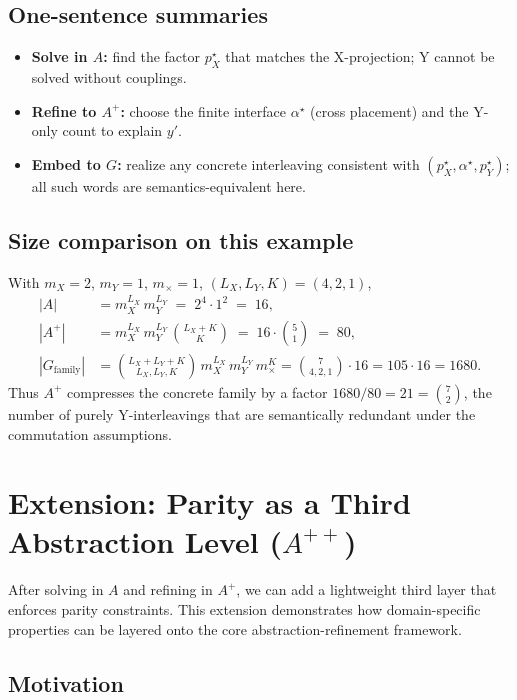\documentclass[11pt]{article}
\begin{document}
\subsection{One-sentence summaries}
\begin{itemize}
\item \textbf{Solve in $A$:} find the factor $p_X^\star$ that matches the X-projection; Y cannot be solved without couplings.
\item \textbf{Refine to $A^{+}$:} choose the finite interface $\alpha^\star$ (cross placement) and the Y-only count to explain $y'$.
\item \textbf{Embed to $G$:} realize any concrete interleaving consistent with $(p_X^\star,\alpha^\star,p_Y^\star)$; all such words are semantics-equivalent here.
\end{itemize}

\subsection{Size comparison on this example}
With $m_X=2$, $m_Y=1$, $m_\times=1$, $(L_X,L_Y,K)=(4,2,1)$,
\begin{align*}
|A| &= m_X^{L_X}\,m_Y^{L_Y} \;=\; 2^4\cdot 1^2 \;=\; 16,\\
|A^{+}| &= m_X^{L_X}\,m_Y^{L_Y}\,\binom{L_X+K}{K} \;=\; 16\cdot \binom{5}{1} \;=\; 80,\\
|G_{\text{family}}| &= \binom{L_X+L_Y+K}{L_X,L_Y,K}\,m_X^{L_X}\,m_Y^{L_Y}\,m_\times^{K}
= \binom{7}{4,2,1}\cdot 16 = 105\cdot 16 = 1680.
\end{align*}
Thus $A^{+}$ compresses the concrete family by a factor ${1680}/{80}=21=\binom{7}{2}$, the number of purely Y-interleavings
that are semantically redundant under the commutation assumptions.


\section{Extension: Parity as a Third Abstraction Level ($A^{++}$)}

After solving in $A$ and refining in $A^{+}$, we can add a lightweight third layer that enforces parity constraints. This extension demonstrates how domain-specific properties can be layered onto the core abstraction-refinement framework.

\subsection{Motivation}
\end{document}
